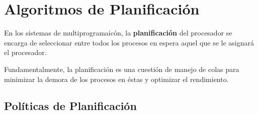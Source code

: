 \documentclass[12pt, a4paper]{article} %
\begin{document}
\section{Algoritmos de Planificación}

En los sistemas de multiprogramaicón, la \textbf{planificación} del procesador se encarga de seleccionar entre todos los procesos en espera aquel que se le asignará el procesador.

Fundamentalmente, la planificación es una cuestión de manejo de colas para minimizar la demora de los procesos en éstas y optimizar el rendimiento.

\subsection{Políticas de Planificación}
\end{document}
